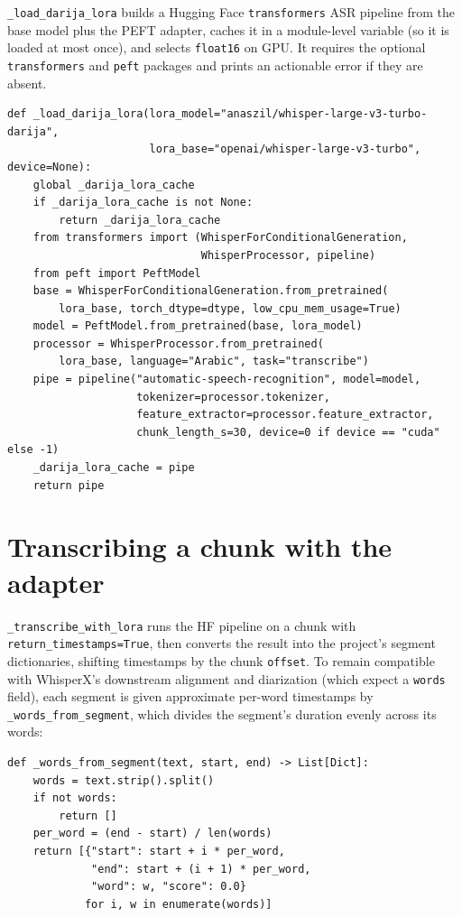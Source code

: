 \documentclass[11pt,a4paper]{report}
\newcommand{\code}[1]{\texttt{\small #1}}
\begin{document}
\code{\_load\_darija\_lora} builds a Hugging Face \code{transformers} ASR pipeline
from the base model plus the PEFT adapter, caches it in a module-level variable
(so it is loaded at most once), and selects \code{float16} on GPU. It requires the
optional \code{transformers} and \code{peft} packages and prints an actionable
error if they are absent.

\begin{lstlisting}[caption={LoRA loader (abridged).}]
def _load_darija_lora(lora_model="anaszil/whisper-large-v3-turbo-darija",
                      lora_base="openai/whisper-large-v3-turbo", device=None):
    global _darija_lora_cache
    if _darija_lora_cache is not None:
        return _darija_lora_cache
    from transformers import (WhisperForConditionalGeneration,
                              WhisperProcessor, pipeline)
    from peft import PeftModel
    base = WhisperForConditionalGeneration.from_pretrained(
        lora_base, torch_dtype=dtype, low_cpu_mem_usage=True)
    model = PeftModel.from_pretrained(base, lora_model)
    processor = WhisperProcessor.from_pretrained(
        lora_base, language="Arabic", task="transcribe")
    pipe = pipeline("automatic-speech-recognition", model=model,
                    tokenizer=processor.tokenizer,
                    feature_extractor=processor.feature_extractor,
                    chunk_length_s=30, device=0 if device == "cuda" else -1)
    _darija_lora_cache = pipe
    return pipe
\end{lstlisting}

\section{Transcribing a chunk with the adapter}

\code{\_transcribe\_with\_lora} runs the HF pipeline on a chunk with
\code{return\_timestamps=True}, then converts the result into the project's segment
dictionaries, shifting timestamps by the chunk \code{offset}. To remain compatible
with WhisperX's downstream alignment and diarization (which expect a \code{words}
field), each segment is given approximate per-word timestamps by
\code{\_words\_from\_segment}, which divides the segment's duration evenly across
its words:

\begin{lstlisting}[caption={Even-split word timestamps for LoRA segments.}]
def _words_from_segment(text, start, end) -> List[Dict]:
    words = text.strip().split()
    if not words:
        return []
    per_word = (end - start) / len(words)
    return [{"start": start + i * per_word,
             "end": start + (i + 1) * per_word,
             "word": w, "score": 0.0}
            for i, w in enumerate(words)]
\end{lstlisting}
\end{document}

